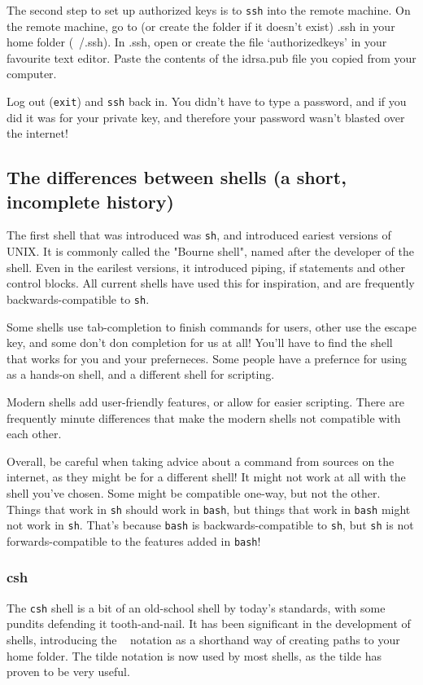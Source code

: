 The second step to set up authorized keys is to {\tt ssh} into the remote machine.
On the remote machine, go to (or create the folder if it doesn't exist) .ssh 
in your home folder (~/.ssh). In .ssh, open or create the file `authorized\textunderscore keys'
in your favourite text editor.
Paste the contents of the id\textunderscore rsa.pub file you copied from your computer.

Log out ({\tt exit}) and {\tt ssh} back in. You didn't have to type a password, and
if you did it was for your private key, and therefore your password wasn't blasted
over the internet!

\subsection{The differences between shells (a short, incomplete history)}
The first shell that was introduced was {\tt sh}, and introduced eariest versions of UNIX.
It is commonly called the "Bourne shell", named after the developer of the shell.
Even in the earilest versions, it introduced piping, if statements and other control blocks.
All current shells have used this for inspiration, and are frequently backwards-compatible to
 {\tt sh}.

Some shells use tab-completion to finish commands for users, other use the escape key,
and some don't don completion for us at all! You'll have to find the shell that works
for you and your preferneces. Some people have a prefernce for using as a hands-on shell, and
a different shell for scripting.

 Modern shells add user-friendly features, or allow for easier scripting. There are frequently
 minute differences that make the modern shells not compatible with each other.

 Overall, be careful when taking advice about a command from sources on the internet,
 as they might be for a different shell! It might not work at all with the shell you've chosen. Some might
 be compatible one-way, but not the other. Things that work in {\tt sh} should work in {\tt bash}, but
 things that work in {\tt bash} might not work in {\tt sh}. That's because {\tt bash} is backwards-compatible
 to {\tt sh}, but {\tt sh} is not forwards-compatible to the features added in {\tt bash}!

 \subsubsection{csh}
 The {\tt csh} shell is a bit of an old-school shell by today's standards, with some
 pundits defending it tooth-and-nail. It has been significant in the development of
 shells, introducing the {\tt ~} notation as a shorthand way of creating paths
 to your home folder. The tilde notation is now used by most shells, as the tilde
has proven to be very useful.

